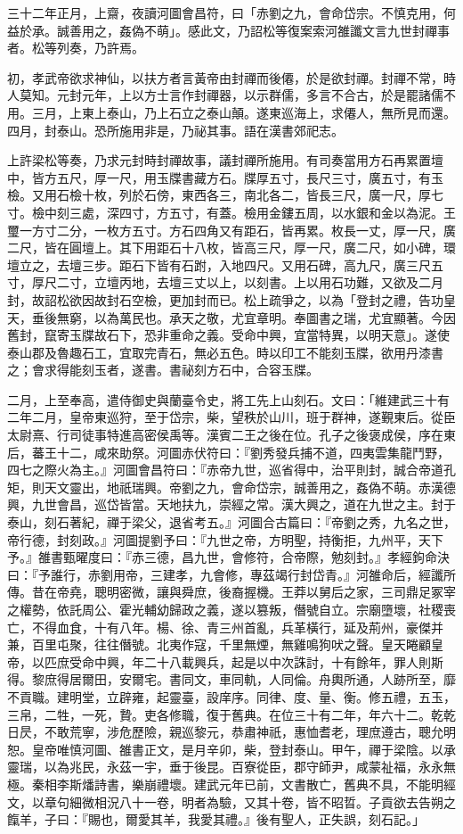 \begin{pinyinscope}
三十二年正月，上齋，夜讀河圖會昌符，曰「赤劉之九，會命岱宗。不慎克用，何益於承。誠善用之，姦偽不萌」。感此文，乃詔松等復案索河雒讖文言九世封禪事者。松等列奏，乃許焉。

初，孝武帝欲求神仙，以扶方者言黃帝由封禪而後僊，於是欲封禪。封禪不常，時人莫知。元封元年，上以方士言作封禪器，以示群儒，多言不合古，於是罷諸儒不用。三月，上東上泰山，乃上石立之泰山顛。遂東巡海上，求僊人，無所見而還。四月，封泰山。恐所施用非是，乃祕其事。語在漢書郊祀志。

上許梁松等奏，乃求元封時封禪故事，議封禪所施用。有司奏當用方石再累置壇中，皆方五尺，厚一尺，用玉牒書藏方石。牒厚五寸，長尺三寸，廣五寸，有玉檢。又用石檢十枚，列於石傍，東西各三，南北各二，皆長三尺，廣一尺，厚七寸。檢中刻三處，深四寸，方五寸，有蓋。檢用金鏤五周，以水銀和金以為泥。王璽一方寸二分，一枚方五寸。方石四角又有距石，皆再累。枚長一丈，厚一尺，廣二尺，皆在圓壇上。其下用距石十八枚，皆高三尺，厚一尺，廣二尺，如小碑，環壇立之，去壇三步。距石下皆有石跗，入地四尺。又用石碑，高九尺，廣三尺五寸，厚尺二寸，立壇丙地，去壇三丈以上，以刻書。上以用石功難，又欲及二月封，故詔松欲因故封石空檢，更加封而已。松上疏爭之，以為「登封之禮，告功皇天，垂後無窮，以為萬民也。承天之敬，尤宜章明。奉圖書之瑞，尤宜顯著。今因舊封，竄寄玉牒故石下，恐非重命之義。受命中興，宜當特異，以明天意」。遂使泰山郡及魯趣石工，宜取完青石，無必五色。時以印工不能刻玉牒，欲用丹漆書之；會求得能刻玉者，遂書。書祕刻方石中，合容玉牒。

二月，上至奉高，遣侍御史與蘭臺令史，將工先上山刻石。文曰：「維建武三十有二年二月，皇帝東巡狩，至于岱宗，柴，望秩於山川，班于群神，遂覲東后。從臣太尉熹、行司徒事特進高密侯禹等。漢賓二王之後在位。孔子之後褒成侯，序在東后，蕃王十二，咸來助祭。河圖赤伏符曰：『劉秀發兵捕不道，四夷雲集龍鬥野，四七之際火為主。』河圖會昌符曰：『赤帝九世，巡省得中，治平則封，誠合帝道孔矩，則天文靈出，地祇瑞興。帝劉之九，會命岱宗，誠善用之，姦偽不萌。赤漢德興，九世會昌，巡岱皆當。天地扶九，崇經之常。漢大興之，道在九世之主。封于泰山，刻石著紀，禪于梁父，退省考五。』河圖合古篇曰：『帝劉之秀，九名之世，帝行德，封刻政。』河圖提劉予曰：『九世之帝，方明聖，持衡拒，九州平，天下予。』雒書甄曜度曰：『赤三德，昌九世，會修符，合帝際，勉刻封。』孝經鉤命決曰：『予誰行，赤劉用帝，三建孝，九會修，專茲竭行封岱青。』河雒命后，經讖所傳。昔在帝堯，聰明密微，讓與舜庶，後裔握機。王莽以舅后之家，三司鼎足冢宰之權勢，依託周公、霍光輔幼歸政之義，遂以篡叛，僭號自立。宗廟墮壞，社稷喪亡，不得血食，十有八年。楊、徐、青三州首亂，兵革橫行，延及荊州，豪傑并兼，百里屯聚，往往僭號。北夷作寇，千里無煙，無雞鳴狗吠之聲。皇天睠顧皇帝，以匹庶受命中興，年二十八載興兵，起是以中次誅討，十有餘年，罪人則斯得。黎庶得居爾田，安爾宅。書同文，車同軌，人同倫。舟輿所通，人跡所至，靡不貢職。建明堂，立辟雍，起靈臺，設庠序。同律、度、量、衡。修五禮，五玉，三帛，二牲，一死，贄。吏各修職，復于舊典。在位三十有二年，年六十二。乾乾日昃，不敢荒寧，涉危歷險，親巡黎元，恭肅神祇，惠恤耆老，理庶遵古，聰允明恕。皇帝唯慎河圖、雒書正文，是月辛卯，柴，登封泰山。甲午，禪于梁陰。以承靈瑞，以為兆民，永茲一宇，垂于後昆。百寮從臣，郡守師尹，咸蒙祉福，永永無極。秦相李斯燔詩書，樂崩禮壞。建武元年已前，文書散亡，舊典不具，不能明經文，以章句細微相況八十一卷，明者為驗，又其十卷，皆不昭晢。子貢欲去告朔之餼羊，子曰：『賜也，爾愛其羊，我愛其禮。』後有聖人，正失誤，刻石記。」


\end{pinyinscope}
